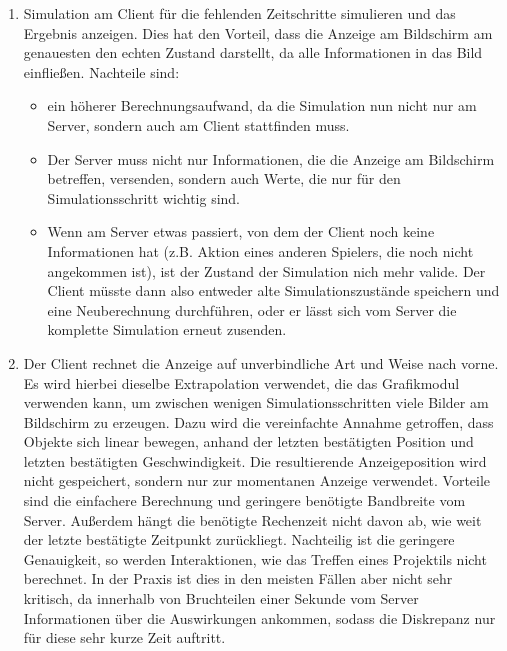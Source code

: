 \begin{enumerate}
\item Simulation am Client für die fehlenden Zeitschritte simulieren und das Ergebnis anzeigen. Dies hat den Vorteil, dass die Anzeige am Bildschirm am genauesten den echten Zustand darstellt, da alle Informationen in das Bild einfließen. Nachteile sind:
\begin{itemize}
 \item ein höherer Berechnungsaufwand, da die Simulation nun nicht nur am Server, sondern auch am Client stattfinden muss. 
 \item Der Server muss nicht nur Informationen, die die Anzeige am Bildschirm betreffen, versenden, sondern auch Werte, die nur für den Simulationsschritt wichtig sind.
 \item Wenn am Server etwas passiert, von dem der Client noch keine Informationen hat (z.B. Aktion eines anderen Spielers, die noch nicht angekommen ist), ist der Zustand der Simulation nich mehr valide. Der Client müsste dann also entweder alte Simulationszustände speichern und eine Neuberechnung durchführen, oder er lässt sich vom Server die komplette Simulation erneut zusenden.
\end{itemize}
\item Der Client rechnet die Anzeige auf unverbindliche Art und Weise nach vorne. Es wird hierbei dieselbe Extrapolation verwendet, die das Grafikmodul verwenden kann, um zwischen wenigen Simulationsschritten viele Bilder am Bildschirm zu erzeugen. Dazu wird die vereinfachte Annahme getroffen, dass Objekte sich linear bewegen, anhand der letzten bestätigten Position und letzten bestätigten Geschwindigkeit. Die resultierende Anzeigeposition wird nicht gespeichert, sondern nur zur momentanen Anzeige verwendet. Vorteile sind die einfachere Berechnung und geringere benötigte Bandbreite vom Server. Außerdem hängt die benötigte Rechenzeit nicht davon ab, wie weit der letzte bestätigte Zeitpunkt zurückliegt. Nachteilig ist die geringere Genauigkeit, so werden Interaktionen, wie das Treffen eines Projektils nicht berechnet. In der Praxis ist dies in den meisten Fällen aber nicht sehr kritisch, da innerhalb von Bruchteilen einer Sekunde vom Server Informationen über die Auswirkungen ankommen, sodass die Diskrepanz nur für diese sehr kurze Zeit auftritt.
\end{enumerate}
